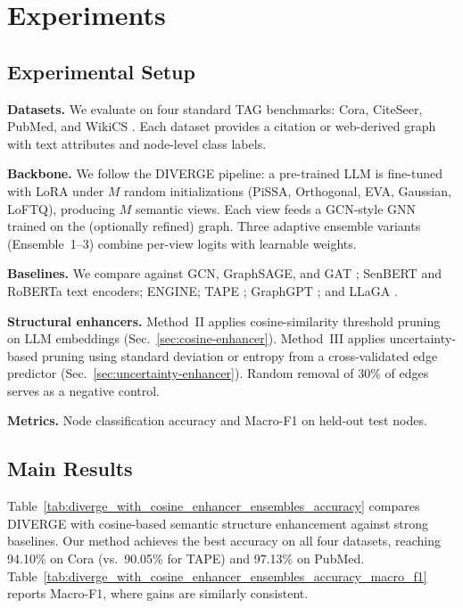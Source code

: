 
\section{Experiments}
\label{sec:experiments}

\subsection{Experimental Setup}
\textbf{Datasets.} We evaluate on four standard TAG benchmarks: Cora, CiteSeer, PubMed,
and WikiCS \citep{cora,giles1998citeseer,pubmed,mernyei2020wikics}. Each dataset
provides a citation or web-derived graph with text attributes and node-level class labels.

\textbf{Backbone.} We follow the DIVERGE pipeline: a pre-trained LLM is fine-tuned with
LoRA under $M$ random initializations (PiSSA, Orthogonal, EVA, Gaussian, LoFTQ),
producing $M$ semantic views. Each view feeds a GCN-style GNN trained on the (optionally
refined) graph. Three adaptive ensemble variants (Ensemble~1--3) combine per-view logits
with learnable weights.

\textbf{Baselines.} We compare against GCN, GraphSAGE, and GAT
\citep{Kipf2016GCN,hamilton2017sage,Velickovic2018GAT}; SenBERT and RoBERTa text
encoders; ENGINE; TAPE \citep{he2024harnessing}; GraphGPT \citep{tang2024graphgpt};
and LLaGA \citep{Chen2024LLaGA}.

\textbf{Structural enhancers.} Method~II applies cosine-similarity threshold pruning on
LLM embeddings (Sec.~\ref{sec:cosine-enhancer}). Method~III applies uncertainty-based
pruning using standard deviation or entropy from a cross-validated edge predictor
(Sec.~\ref{sec:uncertainty-enhancer}). Random removal of 30\% of edges serves as a
negative control.

\textbf{Metrics.} Node classification accuracy and Macro-F1 on held-out test nodes.


\subsection{Main Results}
Table~\ref{tab:diverge_with_cosine_enhancer_ensembles_accuracy} compares DIVERGE with
cosine-based semantic structure enhancement against strong baselines. Our method achieves
the best accuracy on all four datasets, reaching 94.10\% on Cora (vs.\ 90.05\% for TAPE)
and 97.13\% on PubMed. Table~\ref{tab:diverge_with_cosine_enhancer_ensembles_accuracy_macro_f1}
reports Macro-F1, where gains are similarly consistent.

